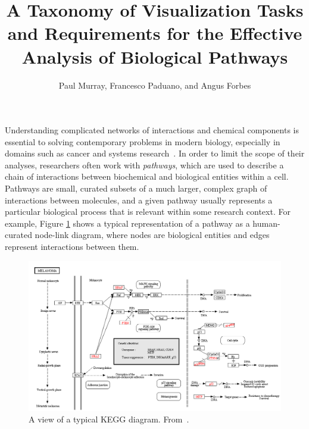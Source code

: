 \documentclass[review,journal]{vgtc}         %
\title{A Taxonomy of Visualization Tasks and Requirements for the Effective Analysis of Biological Pathways}
\author{Paul Murray, Francesco Paduano, and Angus Forbes}
\begin{document}


\maketitle

Understanding complicated networks of interactions and chemical components is essential to solving contemporary problems in modern biology, especially in domains such as cancer and systems research~\cite{hanahan2011hallmarks}. In order to limit the scope of their analyses, researchers often work with \emph{pathways}, which are used to describe a chain of interactions between biochemical and biological entities within a cell. Pathways are small, curated subsets of a much larger, complex graph of interactions between molecules, and a given pathway usually represents a particular biological process that is relevant within some research context. For example, Figure \ref{fig:kvik} shows a typical representation of a pathway as a human-curated node-link diagram, where nodes are biological entities and edges represent interactions between them.

\begin{figure}[htb]
  \centering
  \includegraphics[width=\linewidth]{figures/kegg2}
  \caption{\label{fig:kvik} A view of a typical KEGG diagram. From~\cite{Fjukstad2014kvik}.}
\end{figure}
\end{document}
